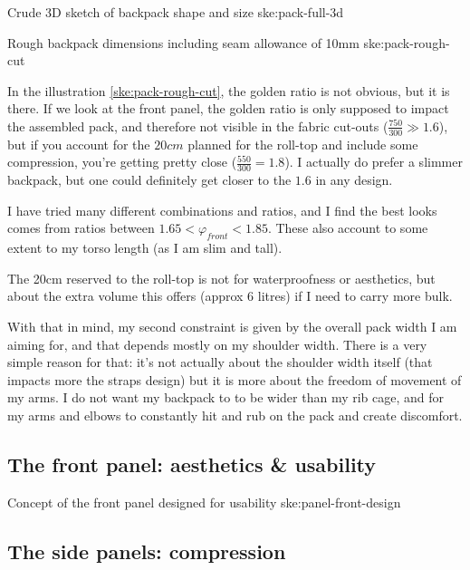 {Crude 3D sketch of backpack shape and size}
{ske:pack-full-3d}

{Rough backpack dimensions including seam allowance of 10mm}
{ske:pack-rough-cut}

In the illustration \ref{ske:pack-rough-cut}, the golden ratio is not obvious, but it is there. If we look at the front panel, the golden ratio is only supposed to impact the assembled pack, and therefore not visible in the fabric cut-outs ($\frac{750}{300} \gg 1.6$), but if you account for the $20cm$ planned for the roll-top and include some compression, you're getting pretty close ($\frac{550}{300} = 1.8$). I actually do prefer a slimmer backpack, but one could definitely get closer to the $1.6$ in any design.

I have tried many different combinations and ratios, and I find the best looks comes from ratios between $1.65 < \varphi_{front} < 1.85$. These also account to some extent to my torso length (as I am slim and tall).

\begin{note}
  The 20cm reserved to the roll-top is not for waterproofness or aesthetics, but about the extra volume this offers (approx 6 litres) if I need to carry more bulk.
\end{note}

With that in mind, my second constraint is given by the overall pack width I am aiming for, and that depends mostly on my shoulder width. There is a very simple reason for that: it's not actually about the shoulder width itself (that impacts more the straps design) but it is more about the freedom of movement of my arms. I do not want my backpack to to be wider than my rib cage, and for my arms and elbows to constantly hit and rub on the pack and create discomfort.

\subsection{The front panel: aesthetics \& usability}

{Concept of the front panel designed for usability}
{ske:panel-front-design}

\subsection{The side panels: compression}

